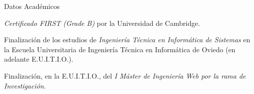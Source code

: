 
\begin{rubric}{Datos Académicos}

  \entry*[2005]
  \emph{Certificado FIRST (Grade B)} por la Universidad de Cambridge.

  \entry*[2006]
  Finalización de los estudios de \emph{Ingeniería Técnica en Informática de Sistemas} en la Escuela Universitaria de Ingeniería Técnica en Informática de Oviedo (en adelante E.U.I.T.I.O.).

  \entry*[2008]
  Finalización, en la E.U.I.T.I.O., del \emph{I Máster de Ingeniería Web por la rama de Investigación}.

\end{rubric}


